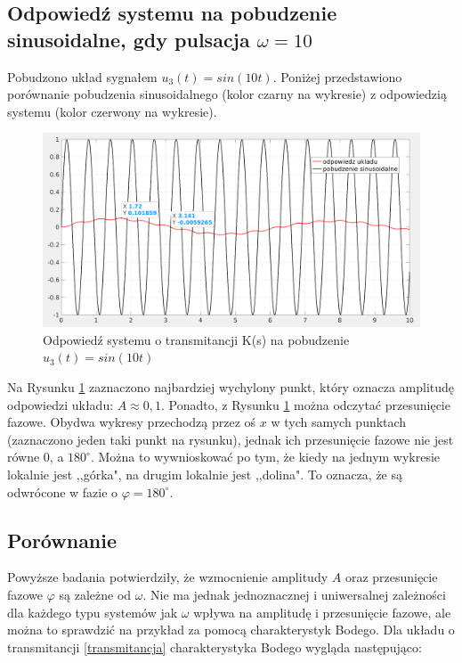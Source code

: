 \documentclass[12pt]{article}
\begin{document}
\subsection{Odpowiedź systemu na pobudzenie sinusoidalne, gdy pulsacja $\omega = 10$}
Pobudzono układ sygnałem $u_3(t)=sin(10 t)$. Poniżej przedstawiono porównanie pobudzenia sinusoidalnego (kolor czarny na wykresie) z odpowiedzią systemu (kolor czerwony na wykresie).
\begin{figure}[H]
    \centering
    \includegraphics[scale=0.2]{2.3.png}
    \caption{Odpowiedź systemu o transmitancji K(s) na pobudzenie $u_3(t)=sin(10 t)$}
    \label{fig:2.3}
\end{figure}

Na Rysunku \ref{fig:2.3} zaznaczono najbardziej wychylony punkt, który oznacza amplitudę odpowiedzi układu: $A \approx 0,1$. Ponadto, z Rysunku \ref{fig:2.3} można odczytać przesunięcie fazowe. Obydwa wykresy przechodzą przez oś $x$ w tych samych punktach (zaznaczono jeden taki punkt na rysunku), jednak ich przesunięcie fazowe nie jest równe 0, a $180 ^\circ$. Można to wywnioskować po tym, że kiedy na jednym wykresie lokalnie jest ,,górka", na drugim lokalnie jest ,,dolina". To oznacza, że są odwrócone w fazie o $\varphi = 180 ^\circ$.

\subsection{Porównanie}
Powyższe badania potwierdziły, że wzmocnienie amplitudy $A$ oraz przesunięcie fazowe $\varphi$ są zależne od $\omega$. Nie ma jednak jednoznacznej i uniwersalnej zależności dla każdego typu systemów jak $\omega$ wpływa na amplitudę i przesunięcie fazowe, ale można to sprawdzić na przykład za pomocą charakterystyk Bodego. Dla układu o transmitancji \ref{transmitancja} charakterystyka Bodego wygląda następująco:
\end{document}
